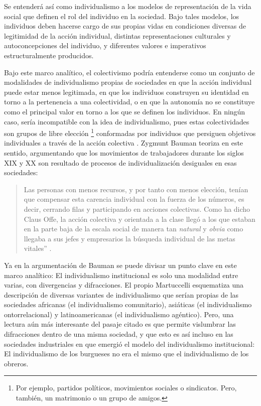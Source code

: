 \documentclass[12pt,twoside]{templates/facsothesis}
\begin{document}
Se entenderá así como individualismo a los modelos de representación de la vida social que definen el rol del individuo en la sociedad. Bajo tales modelos, los individuos deben hacerse cargo de sus propias vidas en condiciones diversas de legitimidad de la acción individual, distintas representaciones culturales y autoconcepciones del individuo, y diferentes valores e imperativos estructuralmente producidos.

Bajo este marco analítico, el colectivismo podría entenderse como un conjunto de modalidades de individualismo propias de sociedades en que la acción individual puede estar menos legitimada, en que los individuos construyen su identidad en torno a la pertenencia a una colectividad, o en que la autonomía no se constituye como el principal valor en torno a los que se definen los individuos. En ningún caso, sería incompatible con la idea de individualismo, pues estas colectividades son grupos de libre elección \footnote{Por ejemplo, partidos políticos, movimientos sociales o sindicatos. Pero, también, un matrimonio o un grupo de amigos.} conformadas por individuos que persiguen objetivos individuales a través de la acción colectiva \citep{arribas1999, moemeka1998}. Zygmunt Bauman teoriza en este sentido, argumentando que los movimientos de trabajadores durante los siglos XIX y XX son resultado de procesos de individualización desiguales en esas sociedades:

\begin{quote}
Las personas con menos recursos, y por tanto con menos elección, tenían que compensar esta carencia individual con la fuerza de los números, es decir, cerrando filas y participando en acciones colectivas. Como ha dicho Claus Offe, la acción colectiva y orientada a la clase llegó a los que estaban en la parte baja de la escala social de manera tan \emph{natural} y \emph{obvia} como llegaba a sus jefes y empresarios la búsqueda individual de las metas vitales'' \citep[p.~23]{bauman2003}.
\end{quote}

Ya en la argumentación de Bauman se puede divisar un punto clave en este marco analítico: El individualismo institucional es solo una modalidad entre varias, con divergencias y difracciones. El propio Martuccelli \citeyearpar{martuccelli2018} esquematiza una descripción de diversas variantes de individualismo que serían propias de las sociedades africanas (el individualismo comunitario), asiáticas (el individualismo ontorrelacional) y latinoamericanas (el individualismo agéntico). Pero, una lectura aún más interesante del pasaje citado es que permite vislumbrar las difracciones dentro de una misma sociedad, y que esto es así incluso en las sociedades industriales en que emergió el modelo del individualismo institucional: El individualismo de los burgueses no era el mismo que el individualismo de los obreros.
\end{document}
